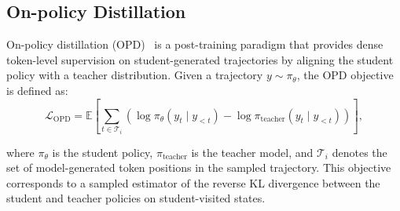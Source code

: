 \subsection{On-policy Distillation}

On-policy distillation (OPD)~\citep{opd,lu2025onpolicydistillation} is a post-training paradigm that provides dense token-level supervision on student-generated trajectories by aligning the student policy with a teacher distribution. Given a trajectory $y \sim \pi_\theta$, the OPD objective is defined as:
\begin{equation}
\mathcal{L}_{\mathrm{OPD}}^{\mathrm{}}
=
\mathbb{E}
\left[
\sum_{t \in \mathcal{T}_i}
\left(
\log \pi_\theta(y_t \mid y_{<t})
-
\log \pi_{\mathrm{teacher}}(y_t \mid y_{<t})
\right)
\right],
\end{equation}

where $\pi_\theta$ is the student policy, $\pi_{\mathrm{teacher}}$ is the teacher model, and $\mathcal{T}_i$ denotes the set of model-generated token positions in the sampled trajectory. This objective corresponds to a sampled estimator of the reverse KL divergence between the student and teacher policies on student-visited states. 








